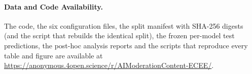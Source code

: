 \paragraph*{Data and Code Availability.}
The code, the six configuration files, the split manifest with SHA-256 digests
(and the script that rebuilds the identical split), the frozen per-model test
predictions, the post-hoc analysis reports and the scripts that reproduce every
table and figure are available at
\url{https://anonymous.4open.science/r/AIModerationContent-ECEE/}.
